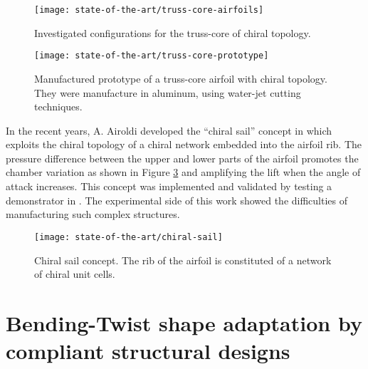   \begin{figure}[!htpb]
    \centering
    \texttt{[image: state-of-the-art/truss-core-airfoils]}
    \caption[Investigated configurations for the truss-core of chiral topology]{Investigated configurations for the truss-core of chiral topology. \cite{Spadoni2007a}}\label{fig:truss-core-airfoil}
  \end{figure}

  \begin{figure}[!htpb]
    \centering
    \texttt{[image: state-of-the-art/truss-core-prototype]}
    \caption[Manufactured prototype of a truss-core airfoil with chiral topology]{Manufactured prototype of a truss-core airfoil with chiral topology. They were manufacture in aluminum, using water-jet cutting techniques. \cite{Spadoni2007b}}\label{fig:truss-core-prototype}
  \end{figure}

  In the recent years, A. Airoldi developed the ``chiral sail'' concept in \cite{Airoldi2012} which exploits the chiral topology of a chiral network embedded into the airfoil rib. The pressure difference between the upper and lower parts of the airfoil promotes the chamber variation as shown in Figure \ref{fig:chiral-sail} and amplifying the lift when the angle of attack increases. This concept was implemented and validated by testing a demonstrator in \cite{Airoldi2015a}. The experimental side of this work showed the difficulties of manufacturing such complex structures.

  \begin{figure}[!htpb]
    \centering
    \texttt{[image: state-of-the-art/chiral-sail]}
    \caption[Chiral sail concept]{Chiral sail concept. The rib of the airfoil is constituted of a network of chiral unit cells. \cite{Airoldi2012}}\label{fig:chiral-sail}
  \end{figure}  

\clearpage
\section{Bending-Twist shape adaptation by compliant structural designs} \label{sec:bendingTwist_state}

